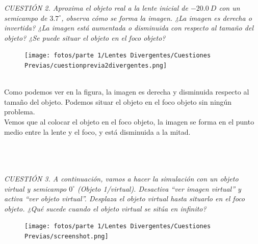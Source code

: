 \documentclass[11pt]{article}
\begin{document}
        \clearpage
        \textit{CUESTIÓN 2.  Aproxima el objeto real a la lente inicial de $-20.0\ D$ con un semicampo de $3.7^\circ$, observa cómo se forma la imagen. ¿La imagen es derecha o invertida? ¿La imagen está aumentada o disminuida con respecto al tamaño del objeto? ¿Se puede situar el objeto en el foco objeto?}\\

        \begin{figure}
            \vspace{-1cm}
            \centering
            \texttt{[image: fotos/parte 1/Lentes Divergentes/Cuestiones Previas/cuestionprevia2divergentes.png]}
        \end{figure}

        \hspace{0mm}\\\hspace{0mm}Como podemos ver en la figura, la imagen es derecha y disminuida respecto al tamaño del objeto. Podemos situar el objeto en el foco objeto sin ningún problema.\\
        
        Vemos que al colocar el objeto en el foco objeto, la imagen se forma en el punto medio entre la lente y el foco, y está disminuida a la mitad. \\\hspace{0mm}\\\hspace{0mm}\\\hspace{0mm}\\\hspace{0mm}
            
        \textit{CUESTIÓN 3.  A continuación, vamos a hacer la simulación con un objeto virtual y semicampo $0^\circ$ (Objeto 1/virtual). Desactiva “ver imagen virtual” y activa “ver objeto virtual”. Desplaza el objeto virtual hasta situarlo en el foco objeto. ¿Qué sucede cuando el objeto virtual se sitúa en infinito?}\\

        \begin{figure}
            \vspace{-1.1cm}
            \centering
            \texttt{[image: fotos/parte 1/Lentes Divergentes/Cuestiones Previas/screenshot.png]}
        \end{figure}
        
\end{document}
